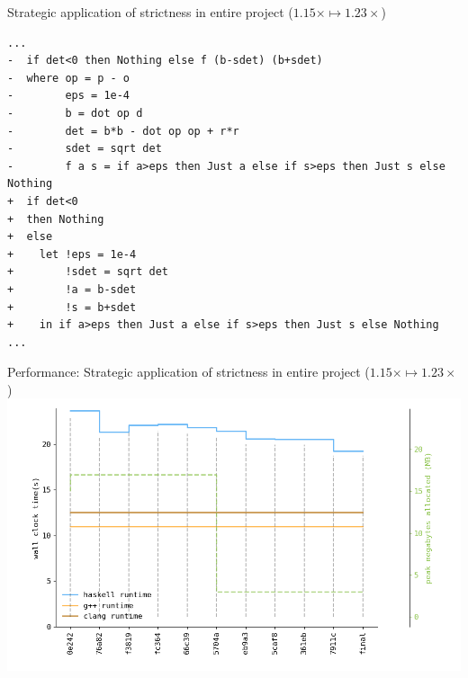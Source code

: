 \documentclass[8pt]{beamer}
\begin{document}
\begin{frame}[fragile]{Strategic application of strictness in entire project ($1.15\times \mapsto 1.23\times$)}
\begin{verbatim}
...
-  if det<0 then Nothing else f (b-sdet) (b+sdet)
-  where op = p - o
-        eps = 1e-4
-        b = dot op d
-        det = b*b - dot op op + r*r
-        sdet = sqrt det
-        f a s = if a>eps then Just a else if s>eps then Just s else Nothing
+  if det<0
+  then Nothing
+  else
+    let !eps = 1e-4
+        !sdet = sqrt det
+        !a = b-sdet
+        !s = b+sdet
+    in if a>eps then Just a else if s>eps then Just s else Nothing
...
\end{verbatim}


\end{frame}

\begin{frame}[fragile]{Performance: Strategic application of strictness in entire project ($1.15\times \mapsto  1.23\times$)}
\includegraphics[height=0.6\textwidth]{perfdata-upto-7911c-gen.png}
\end{frame}
\end{document}
